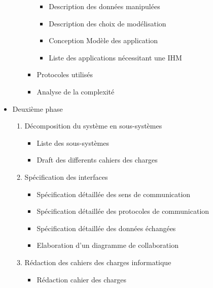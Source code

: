 \begin{itemize}
\begin{enumerate}
\begin{itemize}
\begin{itemize}
\item Description des données manipulées
\item Description des choix de modélisation      
\item Conception Modèle des application
\item Liste des applications nécessitant une IHM          
\end{itemize}          
\item Protocoles utilisés
\item Analyse de la complexité
\end{itemize}       
\end{enumerate} 
\item Deuxième phase
\begin{enumerate}
\item Décomposition du système en sous-systèmes 
\begin{itemize}
\item Liste des sous-systèmes 
\item Draft des differents cahiers des charges
\end{itemize}     
     

\item Spécification des interfaces
\begin{itemize}    
\item Spécification détaillée des sens de communication
\item Spécification détaillée des protocoles de communication
\item Spécification détaillée des données échangées
\item Elaboration d'un diagramme de collaboration
\end{itemize}        

\item Rédaction des cahiers des charges informatique
\begin{itemize}
\item Rédaction cahier des charges 
\end{itemize}
\end{enumerate}


\end{itemize}
